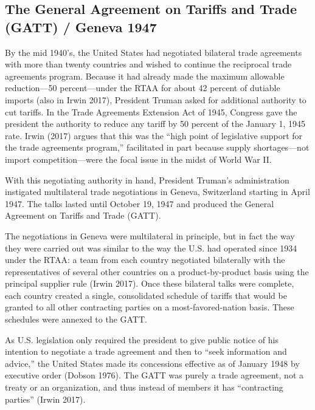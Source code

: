 \documentclass[
  12pt,
]{article}
\begin{document}
\hypertarget{the-general-agreement-on-tariffs-and-trade-gatt-geneva-1947}{%
\subsection{The General Agreement on Tariffs and Trade (GATT) / Geneva 1947}\label{the-general-agreement-on-tariffs-and-trade-gatt-geneva-1947}}

By the mid 1940's, the United States had negotiated bilateral trade agreements with more than twenty countries and wished to continue the reciprocal trade agreements program. Because it had already made the maximum allowable reduction---50 percent---under the RTAA for about 42 percent of dutiable imports (also in Irwin 2017), President Truman asked for additional authority to cut tariffs. In the Trade Agreements Extension Act of 1945, Congress gave the president the authority to reduce any tariff by 50 percent of the January 1, 1945 rate. Irwin (2017) argues that this was the ``high point of legislative support for the trade agreements program,'' facilitated in part because supply shortages---not import competition---were the focal issue in the midst of World War II.

With this negotiating authority in hand, President Truman's administration instigated multilateral trade negotiations in Geneva, Switzerland starting in April 1947. The talks lasted until October 19, 1947 and produced the General Agreement on Tariffs and Trade (GATT).

The negotiations in Geneva were multilateral in principle, but in fact the way they were carried out was similar to the way the U.S. had operated since 1934 under the RTAA: a team from each country negotiated bilaterally with the representatives of several other countries on a product-by-product basis using the principal supplier rule (Irwin 2017). Once these bilateral talks were complete, each country created a single, consolidated schedule of tariffs that would be granted to all other contracting parties on a most-favored-nation basis. These schedules were annexed to the GATT.

As U.S. legislation only required the president to give public notice of his intention to negotiate a trade agreement and then to ``seek information and advice,'' the United States made its concessions effective as of January 1948 by executive order (Dobson 1976). The GATT was purely a trade agreement, not a treaty or an organization, and thus instead of members it has ``contracting parties'' (Irwin 2017).
\end{document}
